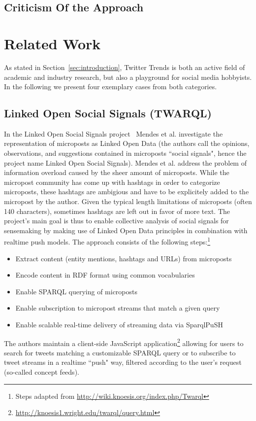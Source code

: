 \documentclass[runningheads,a4paper]{llncs}
\begin{document}
\subsection{Criticism Of the Approach}\label{sec:criticism}

\section{Related Work}\label{sec:relatedwork}
As stated in Section~\ref{sec:introduction}, Twitter Trends is both an active field of academic and industry research, but also a playground for social media hobbyists. In the following we present four exemplary cases from both categories.

\subsection{Linked Open Social Signals (TWARQL)}
In the Linked Open Social Signals project~\cite{Mendes:LOSS} Mendes et al. investigate the representation of microposts as Linked Open Data (the authors call the opinions, observations, and suggestions contained in microposts ``social signals", hence the project name Linked Open Social Signals). Mendes et al. address the problem of information overload caused by the sheer amount of microposts. While the micropost community has come up with hashtags in order to categorize microposts, these hashtags are ambigious and have to be explicitely added to the micropost by the author. Given the typical length limitations of microposts (often 140 characters), sometimes hashtags are left out in favor of more text. The project's main goal is thus to enable collective analysis of social signals for sensemaking by making use of Linked Open Data principles in combination with realtime push models. The approach consists of the following steps:\footnote{Steps adapted from \url{http://wiki.knoesis.org/index.php/Twarql}} 
\begin{itemize}
\item Extract content (entity mentions, hashtags and URLs) from microposts
\item Encode content in RDF format using common vocabularies
\item Enable SPARQL querying of microposts
\item Enable subscription to micropost streams that match a given query
\item Enable scalable real-time delivery of streaming data via SparqlPuSH
\end{itemize}
The authors maintain a client-side JavaScript application\footnote{\url{http://knoesis1.wright.edu/twarql/query.html}} allowing for users to search for tweets matching a customizable SPARQL query or to subscribe to tweet streams in a realtime ``push" way, filtered according to the user's request (so-called concept feeds).
\end{document}

